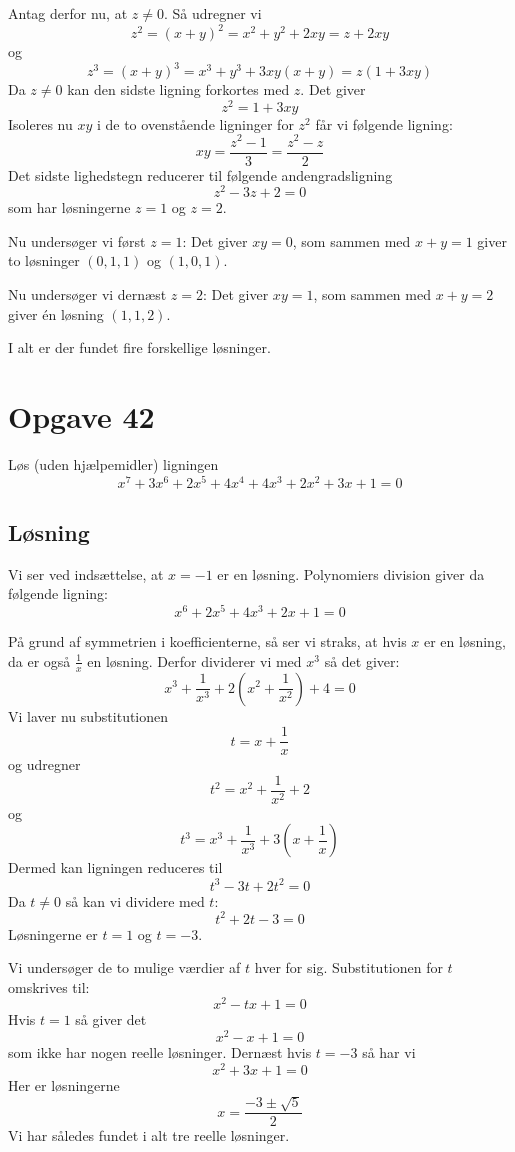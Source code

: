 \documentclass[12pt,oneside,a4paper]{article}
\begin{document}
Antag derfor nu, at $z \ne 0$. Så udregner vi
$$
z^2 = (x+y)^2 = x^2+y^2+2xy = z+2xy
$$
og 
$$
z^3 = (x+y)^3 = x^3+y^3+3xy(x+y) = z(1+3xy)
$$
Da $z\ne 0$ kan den sidste ligning forkortes med $z$. Det giver 
$$
z^2=1+3xy
$$
Isoleres nu $xy$ i de to ovenstående ligninger for $z^2$ får vi følgende ligning:
$$
xy = \frac{z^2-1}{3} = \frac{z^2-z}{2}
$$
Det sidste lighedstegn reducerer til følgende andengradsligning
$$
z^2-3z+2=0
$$
som har løsningerne $z=1$ og $z=2$.

Nu undersøger vi først $z=1$: Det giver $xy=0$, som sammen med $x+y=1$ giver to løsninger $(0, 1, 1)$ og $(1, 0, 1)$.

Nu undersøger vi dernæst $z=2$: Det giver $xy=1$, som sammen med $x+y=2$ giver én løsning $(1, 1, 2)$.

I alt er der fundet fire forskellige løsninger.


\section{Opgave 42}
Løs (uden hjælpemidler) ligningen
$$
x^7+3x^6+2x^5+4x^4+4x^3+2x^2+3x+1=0
$$

\subsection{Løsning}
Vi ser ved indsættelse, at $x=-1$ er en løsning.
Polynomiers division giver da følgende ligning:
$$
x^6+2x^5+4x^3+2x+1=0
$$

På grund af symmetrien i koefficienterne, så ser vi straks, at hvis $x$ er en løsning, da er også $\frac 1x$ en løsning.
Derfor dividerer vi med $x^3$ så det giver:
$$
x^3+\frac {1}{x^3} + 2 \left(x^2+\frac{1}{x^2}\right) + 4 = 0
$$
Vi laver nu substitutionen
$$
t=x+\frac 1x
$$
og udregner
$$
t^2 = x^2+\frac{1}{x^2} + 2
$$
og
$$
t^3 = x^3+\frac {1}{x^3} + 3\left(x+\frac 1x\right)
$$
Dermed kan ligningen reduceres til
$$
t^3-3t+2t^2=0
$$
Da $t\neq 0$ så kan vi dividere med $t$:
$$
t^2+2t-3=0
$$
Løsningerne er $t=1$ og $t=-3$.

Vi undersøger de to mulige værdier af $t$ hver for sig. 
Substitutionen for $t$ omskrives til:
$$
x^2-tx+1=0
$$
Hvis $t=1$ så giver det
$$
x^2-x+1=0
$$
som ikke har nogen reelle løsninger.
Dernæst hvis $t=-3$ så har vi
$$
x^2+3x+1=0
$$
Her er løsningerne
$$
x=\frac{-3\pm\sqrt 5}{2}
$$
Vi har således fundet i alt tre reelle løsninger.
\end{document}
